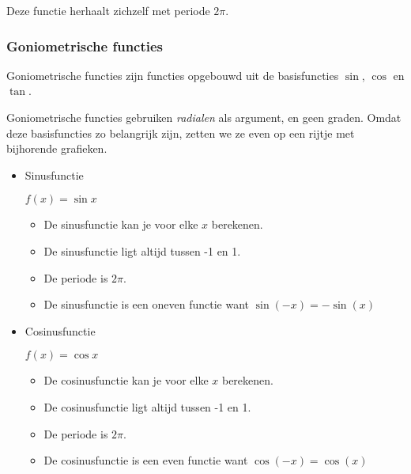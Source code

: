 Deze functie herhaalt zichzelf met periode $2\pi$.

\subsubsection{Goniometrische functies}

Goniometrische functies zijn functies opgebouwd uit de basisfuncties
$\sin$, $\cos$ en $\tan$.

Goniometrische functies gebruiken \emph{radialen} als argument,
en geen graden. Omdat deze basisfuncties zo belangrijk zijn, zetten
we ze even op een rijtje met bijhorende grafieken. 

\begin{itemize}
\item{Sinusfunctie}

$f(x)=\sin x$


\begin{figure}[H]
	\centering
	
\end{figure}

\begin{itemize}
	\item De sinusfunctie kan je voor elke $x$ berekenen. 
	\item De sinusfunctie ligt altijd tussen -1 en 1.
	\item De periode is $2\pi$. 
	\item De sinusfunctie is een oneven functie want $\sin(-x)=-\sin(x)$
\end{itemize}

\item{Cosinusfunctie}

$f(x)=\cos x$


\begin{figure}[H]
	\centering
	
\end{figure}

\begin{itemize}
	\item De cosinusfunctie kan je voor elke $x$ berekenen. 
	\item De cosinusfunctie ligt altijd tussen -1 en 1.
	\item De periode is $2\pi$. 
	\item De cosinusfunctie is een even functie want $\cos(-x)=\cos(x)$
\end{itemize}


\end{itemize}

